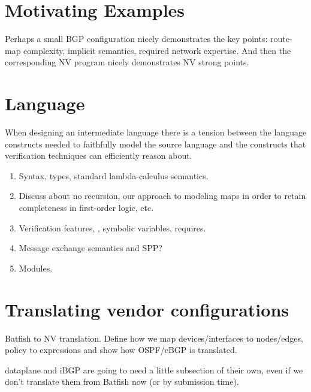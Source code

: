 \documentclass[sigconf,10pt]{acmart}
\begin{document}
\section{Motivating Examples} 
\label{sec:motivation}

Perhaps a small BGP configuration nicely demonstrates the key points: route-map complexity, implicit semantics, required network expertise.
And then the corresponding NV program nicely demonstrates NV strong points.

%
%
%
%

\section{Language} 
\label{sec:language}

When designing an intermediate language there is a tension between the language
constructs needed to faithfully model the source language and the constructs
that verification techniques can efficiently reason about.
\begin{enumerate}
  \item Syntax, types, standard lambda-calculus semantics.
  \item Discuss about no recursion, our approach to modeling maps in order to retain completeness in first-order logic, etc.
  \item Verification features, \EG, symbolic variables, requires.
  \item Message exchange semantics and SPP?
  \item Modules.
\end{enumerate}

%
%
%
%

\section{Translating vendor configurations}
\label{sec:translation}

Batfish to NV translation. Define how we map devices/interfaces to nodes/edges,
policy to expressions and show how OSPF/eBGP is translated.

dataplane and iBGP are going to need a little subsection of their own, even if we don't translate them from Batfish now (or by submission time).
\end{document}

